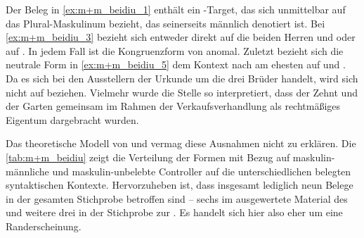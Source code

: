 Der Beleg in \cref{ex:m+m_beidiu_1} enthält ein -Target, das sich
unmittelbar auf das Plural-Maskulinum   bezieht, das
seinerseits männlich denotiert ist.
Bei \cref{ex:m+m_beidiu_3} bezieht sich  entweder direkt auf die
beiden Herren  und 
oder auf  . In jedem Fall ist die Kongruenzform
von  anomal. Zuletzt bezieht sich die neutrale Form  in
\cref{ex:m+m_beidiu_5} dem Kontext nach am ehesten auf
  und  . Da es sich bei
den Ausstellern der Urkunde um die drei Brüder  \autocite[\pno~1201~AB,
472.6--7]{cao2} handelt, wird sich  nicht auf  beziehen.
Vielmehr wurde die Stelle so interpretiert, dass der Zehnt und der Garten
gemeinsam im Rahmen der Verkaufsverhandlung als rechtmäßiges Eigentum
dargebracht wurden.

Das theoretische Modell von \citet{wechsler2009} und \citet{wechslerzlatic2003}
vermag diese Ausnahmen nicht zu erklären. Die \cref{tab:m+m_beidiu} zeigt die
Verteilung der Formen mit Bezug auf maskulin-männliche und maskulin-unbelebte
Controller auf die unterschiedlichen belegten syntaktischen Kontexte.
Hervorzuheben ist, dass insgesamt lediglich neun Belege in der gesamten
Stichprobe betroffen sind -- sechs im ausgewertete Material des 
und weitere drei in der Stichprobe zur \citet{kc}. Es handelt sich hier
also eher um eine Randerscheinung.

